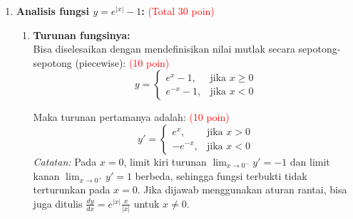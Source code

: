﻿\documentclass[a4paper,12pt]{article}
\begin{document}
\begin{enumerate}
  \item \textbf{Analisis fungsi $y= e^{|x|} - 1$:} \textcolor{red}{(Total 30 poin)}
        \begin{enumerate}
          \item \textbf{Turunan fungsinya:} \\
                Bisa diselesaikan dengan mendefinisikan nilai mutlak secara sepotong-sepotong (piecewise): \textcolor{red}{(10 poin)}
                \[
                  y = \begin{cases}
                    e^x - 1,    & \text{jika } x \ge 0 \\
                    e^{-x} - 1, & \text{jika } x < 0
                  \end{cases}
                \]


                Maka turunan pertamanya adalah: \textcolor{red}{(10 poin)}
                \[
                  y' = \begin{cases}
                    e^x,     & \text{jika } x > 0 \\
                    -e^{-x}, & \text{jika } x < 0
                  \end{cases}
                \]
                \textit{Catatan:} Pada $x=0$, limit kiri turunan $\displaystyle\lim_{x \to 0^-} y' = -1$ dan limit kanan $\lim_{x \to 0^+} y' = 1$ berbeda, sehingga fungsi terbukti tidak terturunkan pada $x=0$. Jika dijawab menggunakan aturan rantai, bisa juga ditulis $\frac{dy}{dx} = e^{|x|} \frac{x}{|x|}$ untuk $x \neq 0$.


\end{enumerate}
\end{enumerate}
\end{document}
